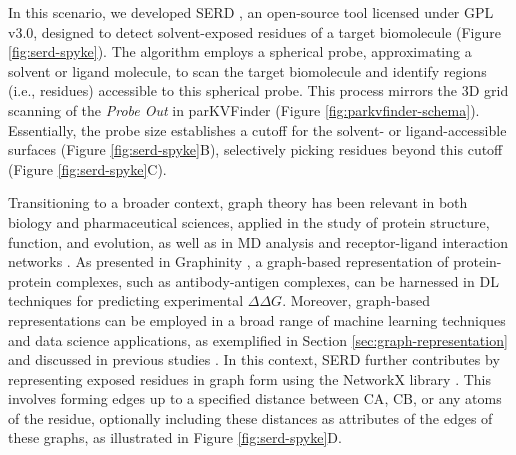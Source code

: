 \documentclass[Ingles]{phdthesis}
\def\ie{i.e.\onedot}
\begin{document}
In this scenario, we developed \ac{SERD} \cite{SERD}, an open-source tool licensed under GPL v3.0, designed to detect solvent-exposed residues of a target biomolecule (Figure \ref{fig:serd-spyke}). The algorithm employs a spherical probe, approximating a solvent or ligand molecule, to scan the target biomolecule and identify regions (\ie, residues) accessible to this spherical probe. This process mirrors the 3D grid scanning of the \textit{Probe Out} in parKVFinder (Figure \ref{fig:parkvfinder-schema}). Essentially, the probe size establishes a cutoff for the solvent- or ligand-accessible surfaces (Figure \ref{fig:serd-spyke}B), selectively picking residues beyond this cutoff (Figure \ref{fig:serd-spyke}C).

Transitioning to a broader context, graph theory has been relevant in both biology and pharmaceutical sciences, applied in the study of protein structure, function, and evolution, as well as in \acs{MD} analysis and receptor-ligand interaction networks \cite{vishveshwara2002,mason2007,hummer2023}. As presented in Graphinity \cite{hummer2023}, a graph-based representation of protein-protein complexes, such as antibody-antigen complexes, can be harnessed in \ac{DL} techniques for predicting experimental $\Delta \Delta G$. Moreover, graph-based representations can be employed in a broad range of machine learning techniques and data science applications, as exemplified in Section \ref{sec:graph-representation} and discussed in previous studies \cite{majeed2020,vishveshwara2002,mason2007}. In this context, \acs{SERD} further contributes by representing exposed residues in graph form using the NetworkX library \cite{networkx}. This involves forming edges up to a specified distance between \acs{CA}, \acs{CB}, or any atoms of the residue, optionally including these distances as attributes of the edges of these graphs, as illustrated in Figure \ref{fig:serd-spyke}D.
\end{document}
